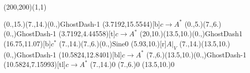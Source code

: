 \unitlength=1bp%

\begin{feynartspicture}(200,200)(1,1)

\FADiagram{}
\FAProp(0.,15.)(7.,14.)(0.,){GhostDash}{-1}
\FALabel(3.7192,15.5544)[b]{$c\to A^*$}
\FAProp(0.,5.)(7.,6.)(0.,){GhostDash}{-1}
\FALabel(3.7192,4.44558)[t]{$c\to A^*$}
\FAProp(20,10.)(13.5,10.)(0.,){GhostDash}{1}
\FALabel(16.75,11.07)[b]{$c^*$}
\FAProp(7.,14.)(7.,6.)(0.,){Sine}{0}
\FALabel(5.93,10.)[r]{$A|_V$}
\FAProp(7.,14.)(13.5,10.)(0.,){GhostDash}{-1}
\FALabel(10.5824,12.8401)[bl]{$c\to A^*$}
\FAProp(7.,6.)(13.5,10.)(0.,){GhostDash}{-1}
\FALabel(10.5824,7.15993)[tl]{$c\to A^*$}
\FAVert(7.,14.){0}
\FAVert(7.,6.){0}
\FAVert(13.5,10.){0}
\end{feynartspicture}

